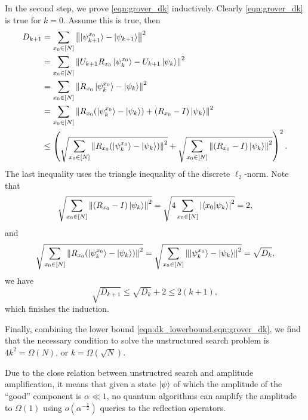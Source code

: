In the second step, we prove \cref{eqn:grover_dk} inductively. 
Clearly  \cref{eqn:grover_dk} is true for $k=0$. 
Assume this is true, then
\begin{equation}
\begin{split}
D_{k+1}&=\sum_{x_0\in[N]}\left\lVert\ket{\psi^{x_0}_{k+1}}-\ket{\psi_{k+1}}\right\rVert^2\\
&=\sum_{x_0\in[N]}\left\lVert U_{k+1}R_{x_0}\ket{\psi^{x_0}_{k}}-U_{k+1}\ket{\psi_{k}}\right\rVert^2\\
&=\sum_{x_0\in[N]}\left\lVert R_{x_0}\ket{\psi^{x_0}_{k}}-\ket{\psi_{k}}\right\rVert^2\\
&=\sum_{x_0\in[N]}\left\lVert R_{x_0}(\ket{\psi^{x_0}_{k}}-\ket{\psi_{k}})+(R_{x_0}-I)\ket{\psi_{k}}\right\rVert^2\\
&\le \left(\sqrt{\sum_{x_0\in[N]}\left\lVert R_{x_0}(\ket{\psi^{x_0}_{k}}-\ket{\psi_{k}})\right\rVert^2}+\sqrt{\sum_{x_0\in[N]}\left\lVert(R_{x_0}-I)\ket{\psi_{k}}\right\rVert^2}\right)^2.
\end{split}
\end{equation}
The last inequality uses the triangle inequality of the discrete $\ell_2$-norm.
Note that
\begin{equation}
\sqrt{\sum_{x_0\in[N]}\left\lVert(R_{x_0}-I)\ket{\psi_{k}}\right\rVert^2}=\sqrt{4\sum_{x_0\in[N]}\left\lvert\braket{x_0|\psi_k}\right\rvert^2}=2,
\end{equation}
and 
\begin{equation}
\sqrt{\sum_{x_0\in[N]}\left\lVert R_{x_0}(\ket{\psi^{x_0}_{k}}-\ket{\psi_{k}})\right\rVert^2}=\sqrt{\sum_{x_0\in[N]}\left\lVert\ket{\psi^{x_0}_{k}}-\ket{\psi_{k}}\right\rVert^2}=\sqrt{D_k},
\end{equation}
we have
\begin{equation}
\sqrt{D_{k+1}}\le \sqrt{D_k}+2\le 2(k+1), 
\end{equation}
which finishes the induction.

Finally, combining the lower bound \cref{eqn:dk_lowerbound,eqn:grover_dk}, we find that the necessary condition to solve the unstructured search problem is $4k^2=\Omega(N)$, or $k=\Omega(\sqrt{N})$.


\begin{rem}
Due to the close relation between unstructred search and amplitude amplification, it means that given a state $\ket{\psi}$ of which the amplitude of the ``good'' component is $\alpha\ll 1$, no quantum algorithms can amplify the amplitude to $\Omega(1)$ using $o(\alpha^{-\frac12})$ queries to the reflection operators.
\end{rem}

\vspace{2em}

